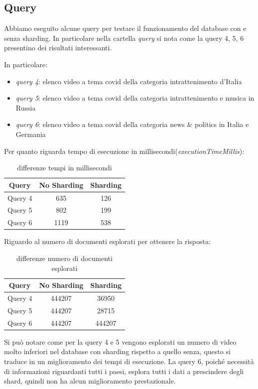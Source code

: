 \documentclass[10pt, a4paper,openany]{article}
\begin{document}
\subsection*{Query}
	Abbiamo eseguito alcune query per testare il funzionamento del database con e senza sharding. In particolare nella cartella \textit{query} si nota come la query 4, 5, 6 presentino dei risultati interessanti.
	
	In particolare:
	\begin{itemize}
		\item \textit{query 4}: elenco video a tema covid della categoria intrattenimento d'Italia
		\item \textit{query 5}: elenco video a tema covid della categoria intrattenimento e musica in Russia
		\item \textit{query 6}: elenco video a tema covid della categoria news \& politics in Italia e Germania
	\end{itemize}
	
	Per quanto riguarda tempo di esecuzione in millisecondi(\textit{executionTimeMillis}):
	\begin{table}[H]
		\centering
		\begin{tabular}{c|c|c}
			\textbf{Query} & \textbf{No Sharding} & \textbf{Sharding} \\
			\hline
			Query 4 & 635 & 126 \\
			Query 5 & 802 & 199 \\
			Query 6 & 1119 & 538 
		\end{tabular}
		\caption{differenze tempi in millisecondi}
	\end{table}
	
	Riguardo al numero di documenti esplorati per ottenere la risposta:
	\begin{table}[H]
		\centering
		\begin{tabular}{c|c|c}
			\textbf{Query} & \textbf{No Sharding} & \textbf{Sharding} \\
			\hline
			Query 4 & 444207 & 36950 \\
			Query 5 & 444207 & 28715 \\
			Query 6 & 444207 & 444207 
		\end{tabular}
		\caption{differenze numero di documenti esplorati}
	\end{table}
	
	Si può notare come per la query 4 e 5 vengono esplorati un numero di video molto inferiori nel database con sharding rispetto a quello senza, questo si traduce in un miglioramento dei tempi di esecuzione. La query 6, poiché necessità di informazioni riguardanti tutti i paesi, esplora tutti i dati a prescindere degli shard, quindi non ha alcun miglioramento prestazionale.
	
\end{document}
